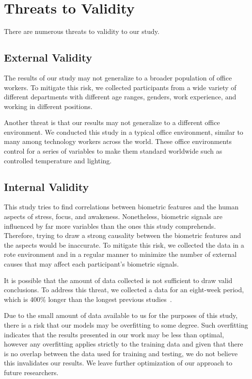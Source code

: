 \section{Threats to Validity}
There are numerous threats to validity to our study.

\subsection{External Validity}
The results of our study may 
 not generalize to a broader population of office workers.
To mitigate this risk, we collected participants
from a wide variety of different departments
with different age ranges, genders, work experience, and 
working in different positions.

Another threat is that our results may not generalize
to a different office environment. We conducted
this study in a typical office environment, similar to many
among technology workers across the world.
These office environments control for a series of
variables to make them standard worldwide such
as controlled temperature and lighting.

\subsection{Internal Validity}
This study tries to find correlations between
biometric features and the human aspects of stress, focus, and awakeness.
Nonetheless, biometric signals are influenced by far more
variables than the ones this study comprehends.
Therefore, trying to draw a strong causality between the biometric
features and the aspects would be inaccurate.
To mitigate this risk,  we collected the data
in a rote environment and in a regular manner 
to minimize the number of 
external causes that may affect each participant's
biometric signals.

It is possible that the amount of data collected
is not sufficient
to draw valid conclusions. To address this threat, 
we collected a data for an eight-week period, which is
400\% longer than the longest previous studies~\cite{zuger18,Muller16}.

Due to the small amount of data available to us for the purposes of this study, there is a risk
that our models may be overfitting to some degree. Such overfitting indicates that the results presented in our work may be less than optimal, however any overfitting applies strictly to the training data and given that there is no overlap between the data used for training and testing, we do not believe this invalidates our results.
We leave further optimization of our approach to future researchers.


